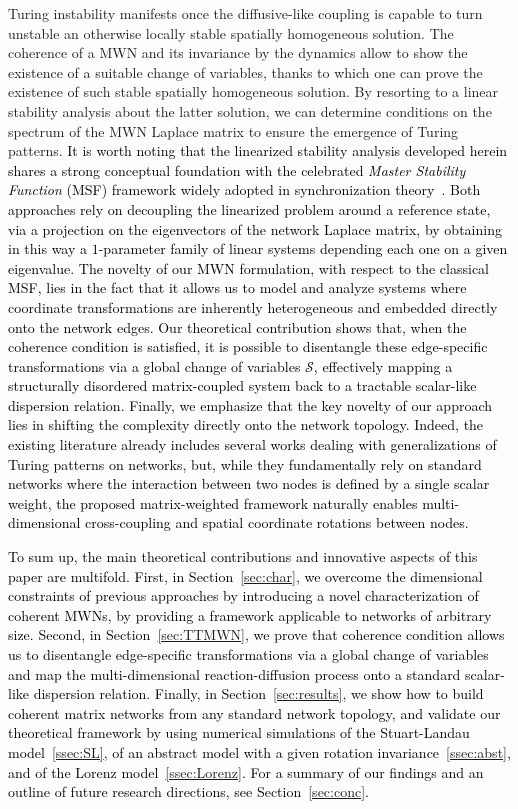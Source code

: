 \documentclass[aps,showpacs,preprintnumbers,amsmath,amssymb,twocolumn,superscriptaddress,floatfix,nofootinbib,10pt,pre]{revtex4-1}
\begin{document}
Turing instability manifests once the diffusive-like coupling is capable to turn unstable an otherwise locally stable spatially homogeneous solution. The coherence of a MWN and its invariance by the dynamics allow to show the existence of a suitable change of variables, thanks to which one can prove the existence of such stable spatially homogeneous solution. By resorting to a linear stability analysis about the latter solution, we can determine conditions on the spectrum of the MWN Laplace matrix to ensure the emergence of Turing patterns. \textcolor{black}{It is worth noting that the linearized stability analysis developed herein shares a strong conceptual foundation with the celebrated \textit{Master Stability Function} (MSF) framework widely adopted in synchronization theory~\cite{pecora1998master}. Both approaches rely on decoupling the linearized problem around a reference state, via a projection on the eigenvectors of the network Laplace matrix, by obtaining in this way a $1$-parameter family of linear systems depending each one on a given eigenvalue. The novelty of our MWN formulation, with respect to the classical MSF, lies in the fact that it allows us to model and analyze systems where coordinate transformations are inherently heterogeneous and embedded directly onto the network edges. Our theoretical contribution shows that, when the coherence condition is satisfied, it is possible to disentangle these edge-specific transformations via a global change of variables $\mathcal{S}$, effectively mapping a structurally disordered matrix-coupled system back to a tractable scalar-like dispersion relation.}
\textcolor{black}{Finally, we emphasize that the key novelty of our approach lies in shifting the complexity directly onto the network topology. Indeed, the existing literature already includes several works dealing with generalizations of Turing patterns on networks, but, while they fundamentally rely on standard networks where the interaction between two nodes is defined by a single scalar weight, the proposed matrix-weighted framework naturally enables multi-dimensional cross-coupling and spatial coordinate rotations between nodes.}


\textcolor{black}{To sum up, the main theoretical contributions and innovative aspects of this paper are multifold. First, in Section~\ref{sec:char}, we overcome the dimensional constraints of previous approaches by introducing a novel characterization of coherent MWNs, by providing a framework applicable to networks of arbitrary size. Second, in Section~\ref{sec:TTMWN}, we prove that coherence condition allows us to disentangle edge-specific transformations via a global change of variables and map the multi-dimensional reaction-diffusion process onto a standard scalar-like dispersion relation. Finally, in Section~\ref{sec:results}, we show how to build coherent matrix networks from any standard network topology, and validate our theoretical framework by using numerical simulations of the Stuart-Landau model~\ref{ssec:SL}, of an abstract model with a given rotation invariance~\ref{ssec:abst}, and of the Lorenz model~\ref{ssec:Lorenz}. For a summary of our findings and an outline of future research directions, see Section~\ref{sec:conc}.}
\end{document}
